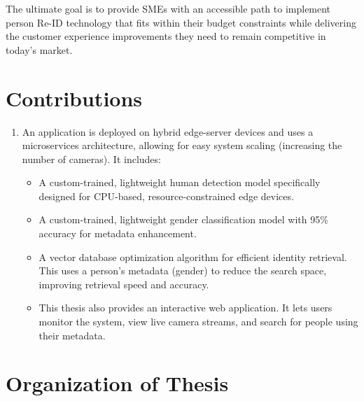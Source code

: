 \documentclass[../main.tex]{subfiles}
\begin{document}
The ultimate goal is to provide SMEs with an accessible path to implement person Re-ID technology that fits within their budget constraints while delivering the customer experience improvements they need to remain competitive in today's market.


\section{Contributions}
\label{sec:contribution}

\begin{enumerate}
    \item An application is deployed on hybrid edge-server devices and uses a microservices architecture, allowing for easy system scaling (increasing the number of cameras). It includes:
    \begin{itemize}
        \item A custom-trained, lightweight human detection model specifically designed for CPU-based, resource-constrained edge devices.
        \item A custom-trained, lightweight gender classification model with 95\% accuracy for metadata enhancement.
        \item A vector database optimization algorithm for efficient identity retrieval. This uses a person's metadata (gender) to reduce the search space, improving retrieval speed and accuracy.
    \item This thesis also provides an interactive web application. It lets users monitor the system, view live camera streams, and search for people using their metadata.
\end{itemize} 
\end{enumerate}

\section{Organization of Thesis}
\label{sec:organize}
\end{document}
